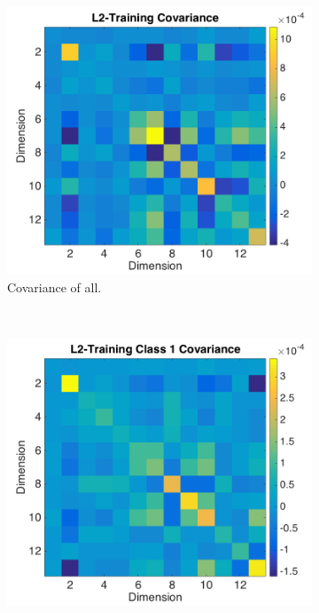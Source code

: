\documentclass[a4paper, 10pt, conference]{ieeeconf}
\begin{document}
\begin{figure}[!ht]
  \captionsetup[subfigure]{position=b}
  \centering
    \begin{subfigure}{0.45\textwidth}
      \includegraphics[width=\textwidth]{pic/covl2.png}
      \caption{Covariance of all.}
      \label{fig:covl2}
    \end{subfigure}
    ~
    \begin{subfigure}{0.45\textwidth}
      \includegraphics[width=\textwidth]{pic/covl2class1.png}

\end{subfigure}
\end{figure}
\end{document}
